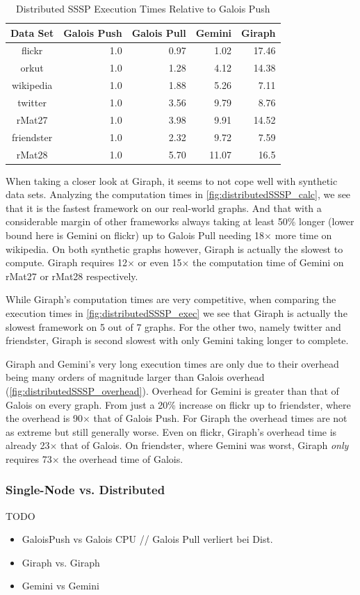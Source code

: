 \begin{table}
\renewcommand{\arraystretch}{1.3}
\centering
\caption{Distributed SSSP Execution Times Relative to Galois Push}
\begin{tabular}{crrrr}
\hline
\bf{Data Set}&Galois Push&Galois Pull&Gemini&Giraph\\\hline
flickr&1.0&0.97&1.02&17.46\\
orkut&1.0&1.28&4.12&14.38\\
wikipedia&1.0&1.88&5.26&7.11\\
twitter&1.0&3.56&9.79&8.76\\
rMat27&1.0&3.98&9.91&14.52\\
friendster&1.0&2.32&9.72&7.59\\
rMat28&1.0&5.70&11.07&16.5\\\hline
\end{tabular}
\label{tbl:ssspexec}
\end{table}



When taking a closer look at Giraph, it seems to not cope well with synthetic data sets. Analyzing the computation times in \autoref{fig:distributedSSSP_calc}, we see that it is the fastest framework on our real-world graphs. And that with a considerable margin of other frameworks always taking at least 50\% longer (lower bound here is Gemini on flickr) up to Galois Pull needing 18$\times$ more time on wikipedia.  
On both synthetic graphs however, Giraph is actually the slowest to compute. Giraph requires 12$\times$ or even 15$\times$ the computation time of Gemini on rMat27 or rMat28 respectively.

While Giraph's computation times are very competitive, when comparing the execution times in \autoref{fig:distributedSSSP_exec} we see that Giraph is actually the slowest framework on 5 out of 7 graphs. For the other two, namely twitter and friendster, Giraph is second slowest with only Gemini taking longer to complete.

Giraph and Gemini's very long execution times are only due to their overhead being many orders of magnitude larger than Galois overhead (\autoref{fig:distributedSSSP_overhead}).
Overhead for Gemini is greater than that of Galois on every graph. From just a 20\% increase on flickr up to friendster, where the overhead is 90$\times$ that of Galois Push.
For Giraph the overhead times are not as extreme but still generally worse. Even on flickr, Giraph's overhead time is already 23$\times$ that of Galois. On friendster, where Gemini was worst, Giraph \emph{only} requires 73$\times$ the overhead time of Galois.



\subsubsection{Single-Node vs. Distributed}
TODO
\begin{itemize}
	\item GaloisPush vs Galois CPU // Galois Pull verliert bei Dist.
	\item Giraph vs. Giraph
	\item Gemini vs Gemini
\end{itemize}


